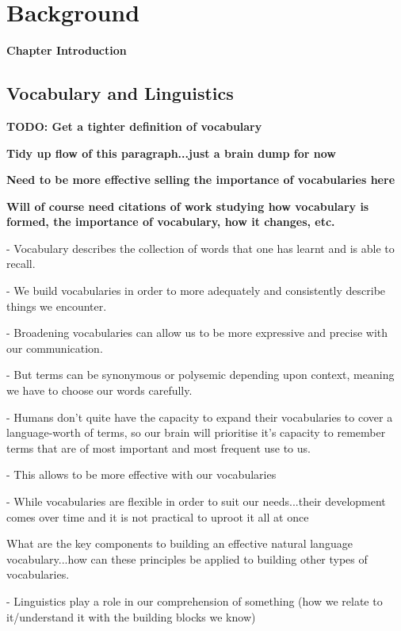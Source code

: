 \chapter{Background}
\label{chapter:Background}

\textbf{Chapter Introduction}

\section{Vocabulary and Linguistics} %
\label{sec:vocabulary_and_linguistics}

\textbf{TODO: Get a tighter definition of vocabulary}

\textbf{Tidy up flow of this paragraph...just a brain dump for now}

\textbf{Need to be more effective selling the importance of vocabularies here}

\textbf{Will of course need citations of work studying how vocabulary is formed, the importance of vocabulary, how it changes, etc.}

- Vocabulary describes the collection of words that one has learnt and is able to recall.

- We build vocabularies in order to more adequately and consistently describe things we encounter.

- Broadening vocabularies can allow us to be more expressive and precise with our communication.

- But terms can be synonymous or polysemic depending upon context, meaning we have to choose our words carefully.

- Humans don't quite have the capacity to expand their vocabularies to cover a language-worth of terms, so our brain will prioritise it's capacity to remember terms that are of most important and most frequent use to us.

- This allows to be more effective with our vocabularies

- While vocabularies are flexible in order to suit our needs...their development comes over time and it is not practical to uproot it all at once

What are the key components to building an effective natural language vocabulary...how can these principles be applied to building other types of vocabularies.

- Linguistics play a role in our comprehension of something (how we relate to it/understand it with the building blocks we know)

